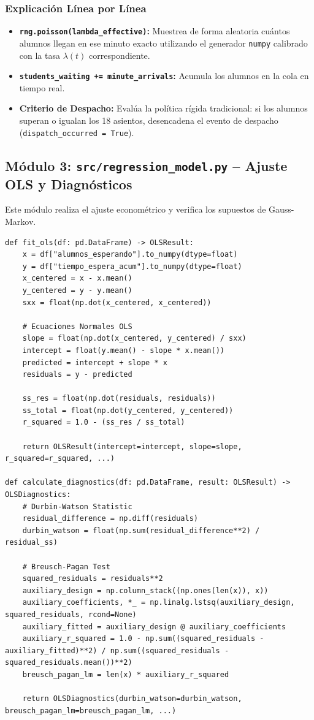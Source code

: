 \documentclass[12pt,letterpaper]{article}
\begin{document}
\subsubsection{Explicación Línea por Línea}
\begin{itemize}
	\item \textbf{\texttt{rng.poisson(lambda\_effective)}:} Muestrea de forma aleatoria cuántos alumnos llegan en ese minuto exacto utilizando el generador \texttt{numpy} calibrado con la tasa $\lambda(t)$ correspondiente.
	\item \textbf{\texttt{students\_waiting += minute\_arrivals}:} Acumula los alumnos en la cola en tiempo real.
	\item \textbf{Criterio de Despacho:} Evalúa la política rígida tradicional: si los alumnos superan o igualan los 18 asientos, desencadena el evento de despacho (\texttt{dispatch\_occurred = True}).
\end{itemize}

\subsection{Módulo 3: \texttt{src/regression\_model.py} -- Ajuste OLS y Diagnósticos}
Este módulo realiza el ajuste econométrico y verifica los supuestos de Gauss-Markov.

\begin{lstlisting}[caption={Ajuste OLS y Diagnósticos en src/regression\_model.py}]
def fit_ols(df: pd.DataFrame) -> OLSResult:
    x = df["alumnos_esperando"].to_numpy(dtype=float)
    y = df["tiempo_espera_acum"].to_numpy(dtype=float)
    x_centered = x - x.mean()
    y_centered = y - y.mean()
    sxx = float(np.dot(x_centered, x_centered))

    # Ecuaciones Normales OLS
    slope = float(np.dot(x_centered, y_centered) / sxx)
    intercept = float(y.mean() - slope * x.mean())
    predicted = intercept + slope * x
    residuals = y - predicted
    
    ss_res = float(np.dot(residuals, residuals))
    ss_total = float(np.dot(y_centered, y_centered))
    r_squared = 1.0 - (ss_res / ss_total)

    return OLSResult(intercept=intercept, slope=slope, r_squared=r_squared, ...)

def calculate_diagnostics(df: pd.DataFrame, result: OLSResult) -> OLSDiagnostics:
    # Durbin-Watson Statistic
    residual_difference = np.diff(residuals)
    durbin_watson = float(np.sum(residual_difference**2) / residual_ss)
    
    # Breusch-Pagan Test
    squared_residuals = residuals**2
    auxiliary_design = np.column_stack((np.ones(len(x)), x))
    auxiliary_coefficients, *_ = np.linalg.lstsq(auxiliary_design, squared_residuals, rcond=None)
    auxiliary_fitted = auxiliary_design @ auxiliary_coefficients
    auxiliary_r_squared = 1.0 - np.sum((squared_residuals - auxiliary_fitted)**2) / np.sum((squared_residuals - squared_residuals.mean())**2)
    breusch_pagan_lm = len(x) * auxiliary_r_squared
    
    return OLSDiagnostics(durbin_watson=durbin_watson, breusch_pagan_lm=breusch_pagan_lm, ...)
\end{lstlisting}
\end{document}
